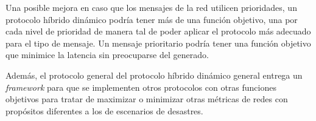 Una posible mejora en caso que los mensajes de la red utilicen prioridades,
un protocolo híbrido dinámico podría tener más de una función objetivo, una por
cada nivel de prioridad de manera tal de poder aplicar el protocolo más adecuado
para el tipo de mensaje. Un mensaje prioritario podría tener una función objetivo
que minimice la latencia sin preocuparse del \overhead{} generado.


Además, el protocolo general del protocolo híbrido dinámico general entrega un
\textit{framework} para que se implementen otros protocolos con otras funciones
objetivos para tratar de maximizar o minimizar otras métricas de redes con
propósitos diferentes a los de escenarios de desastres.

